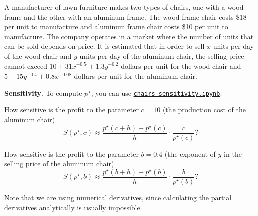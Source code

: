 \documentclass{workbook}
\begin{document}
\begin{slide}

\question

\begin{problem}%
	A manufacturer of lawn furniture makes two types of chairs, one with a wood frame and the other with an aluminum frame. The wood frame chair costs \$18 per unit to manufacture and aluminum frame chair costs \$10 per unit to manufacture. The company operates in a market where the number of units that can be sold depends on price. It is estimated that in order to sell $x$ units per day of the wood chair and $y$ units per day of the aluminum chair, the selling price cannot exceed $10 + 31x^{-0.5} + 1.3y^{-0.2}$ dollars per unit for the wood chair and $5 + 15y^{-0.4} + 0.8x^{-0.08}$ dollars per unit for the aluminum chair.
\end{problem}


\textbf{Sensitivity}. To compute $p^\star$, you can use \href{https://utoronto.syzygy.ca/jupyter/user-redirect/git-pull?repo=https://github.com/bigfatbernie/IBLMathModeling&subPath=python/chairs_sensitivity.ipynb}{\tt chairs_sensitivity.ipynb}.

\begin{parts}
	\item How sensitive is the profit to the parameter $c = 10$ (the production cost of the aluminum chair)
		\[ S(p^\star, c) %
			\approx \frac{p^\star(c+h) - p^\star(c)}{h} \cdot \frac{c}{p^\star(c)}?
		\]

	\item How sensitive is the profit to the parameter $b = 0.4$ (the exponent of $y$ in the selling price of the aluminum chair)
		\[ S(p^\star, b) \approx \frac{p^\star(b+h) - p^\star(b)}{h} \cdot \frac{b}{p^\star(b)}?
		\]
\end{parts}


\begin{solution}
\hspace{-3em}Note that we are using numerical derivatives, since calculating the partial derivatives analytically is usually impossible.	
\end{solution}



\end{slide}
\end{document}
